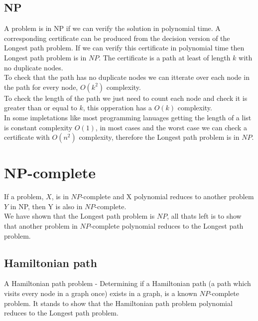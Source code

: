 \documentclass[a4paper,11pt]{article}
\begin{document}
    \subsection{NP}
    A problem is in NP if we can verify the solution in polynomial time. A 
    corresponding certificate can be produced from the decision version of the 
    Longest path problem. If we can verify this certificate in polynomial time 
    then Longest path problem is in $NP$. The certificate is a path at least of 
    length $k$ with no duplicate nodes.\\ 
    To check that the path has no duplicate nodes we can itterate over each node
     in the path for every node, $O(k^2)$ complexity. 
    \\To check the length of the path we just need to count each node
    and check it is greater than or equal to $k$, this opperation has a $O(k)$ 
    complexity. 
    \\In some impletations like most programming lanuages getting the length of 
    a list is constant complexity $O(1)$, in most cases and the worst 
    case we can check a certificate with $O(n^2)$ complexity, therefore the
    Longest path problem is in $NP$.

\section{NP-complete}
If a problem, $X$, is in $NP$-complete and X polynomial reduces to another 
problem $Y$ in NP, then Y is also in $NP$-complete.\\
We have shown that the Longest path problem is $NP$, all thats left is to show 
that another problem in $NP$-complete polynomial reduces to the Longest path 
problem.
\pagebreak
\subsection{Hamiltonian path}
A Hamiltonian path problem - Determining if a Hamiltonian path (a path which 
visits every node in a graph once) exists in a graph, is a known $NP$-complete
problem. It stands to show that the Hamiltonian path problem polynomial reduces 
to the Longest path problem.
\end{document}
